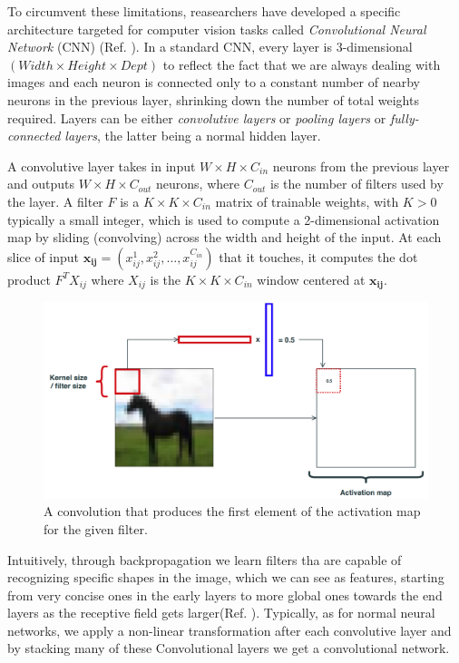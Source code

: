 \documentclass[LaM,binding=0.6cm]{./packages/sapthesis/sapthesis}
\begin{document}
            To circumvent these limitations, reasearchers have developed a specific architecture targeted for computer vision tasks called \textit{Convolutional Neural Network} (CNN) (Ref. ).
            In a standard CNN, every layer is $3$-dimensional $(Width \times Height \times Dept) $ to reflect the fact that we are always dealing with images 
            and each neuron is connected only to a constant number of nearby neurons in the previous layer, shrinking down the number of total weights required.
            Layers can be either \textit{convolutive layers} or \textit{pooling layers} or \textit{fully-connected layers}, the latter being a normal hidden layer.

            A convolutive layer takes in input $W \times H \times C_{in}$ neurons from the previous layer and outputs $W \times H \times C_{out}$ neurons, where $ C_{out}$
            is the number of filters used by the layer. A filter $F$ is a $K \times K \times C_{in}$ matrix of trainable weights, with $K>0$ typically a small integer, which is used to
            compute a 2-dimensional activation map by sliding (convolving) across the width and height of the input. At each slice of input 
            $ \mathbf{x_{ij}} = (x^{1}_{ij}, x^{2}_{ij}, \ldots, x^{C_{in}}_{ij})$ that it touches, it computes the dot product $ F^{T}X_{ij}$
            where $X_{ij}$ is the $K \times K \times C_{in}$ window centered at $\mathbf{x_{ij}}$.
            \begin{figure}[hb!]
                \centering
                \includegraphics[scale=0.30]{convolution}
                \caption{A convolution that produces the first element of the activation map for the given filter.}
                \label{fig:conv}
            \end{figure}
            Intuitively, through backpropagation we learn filters tha are capable of recognizing specific shapes in the image, which we can see as features,
            starting from very concise ones in the early layers to more global ones towards the end layers as the receptive field gets larger(Ref. ). 
            Typically, as for normal neural networks, we apply a non-linear transformation after each convolutive layer and by stacking many of these Convolutional
            layers we get a convolutional network.
            
\end{document}
